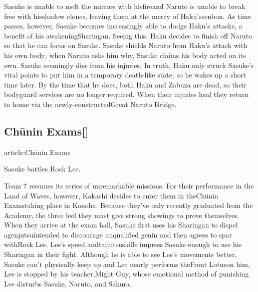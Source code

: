 \documentclass[a4paper,12pt]{article}
\begin{document}
Sasuke is unable to melt the mirrors with hisfireand Naruto is unable to break free with hisshadow clones, leaving them at the mercy of Haku'ssenbon. As time passes, however, Sasuke becomes increasingly able to dodge Haku's attacks, a benefit of his awakeningSharingan. Seeing this, Haku decides to finish off Naruto so that he can focus on Sasuke. Sasuke shields Naruto from Haku's attack with his own body; when Naruto asks him why, Sasuke claims his body acted on its own. Sasuke seemingly dies from his injuries. In truth, Haku only struck Sasuke's vital points to put him in a temporary death-like state, so he wakes up a short time later. By the time that he does, both Haku and Zabuza are dead, so their bodyguard services are no longer required. When their injuries heal they return to home via the newly-constructedGreat Naruto Bridge.\\ \par \vspace{0.5cm}

\subsection*{Chūnin Exams[]}\n\nMain article:Chūnin Exams\\ \par \vspace{0.5cm}

Sasuke battles Rock Lee.\\ \par \vspace{0.5cm}

Team 7 resumes its series of unremarkable missions. For their performance in the Land of Waves, however, Kakashi decides to enter them in theChūnin Examstaking place in Konoha. Because they've only recently graduated from the Academy, the three feel they must give strong showings to prove themselves. When they arrive at the exam hall, Sasuke first uses his Sharingan to dispel agenjutsuintended to discourage unqualified genin and then agrees to spar withRock Lee. Lee's speed andtaijutsuskills impress Sasuke enough to use his Sharingan in their fight. Although he is able to see Lee's movements better, Sasuke can't physically keep up and Lee nearly performs theFront Lotuson him. Lee is stopped by his teacher,Might Guy, whose emotional method of punishing Lee disturbs Sasuke, Naruto, and Sakura.\\ \par \vspace{0.5cm}
\end{document}
